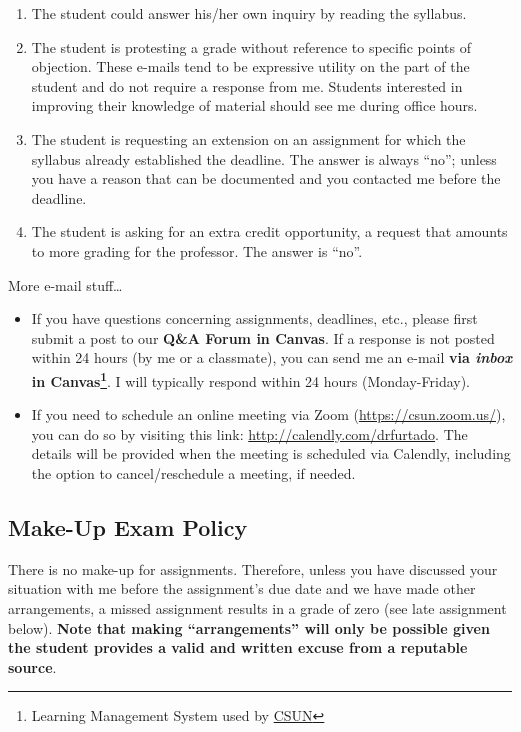 \documentclass[11pt,]{article}
\providecommand{\tightlist}{%
  \setlength{\itemsep}{0pt}\setlength{\parskip}{0pt}}
\begin{document}
\begin{enumerate}
\def\labelenumi{\arabic{enumi}.}
\tightlist
\item
  The student could answer his/her own inquiry by reading the syllabus.
\item
  The student is protesting a grade without reference to specific points
  of objection. These e-mails tend to be expressive utility on the part
  of the student and do not require a response from me. Students
  interested in improving their knowledge of material should see me
  during office hours.
\item
  The student is requesting an extension on an assignment for which the
  syllabus already established the deadline. The answer is always
  ``no''; unless you have a reason that can be documented and you
  contacted me before the deadline.
\item
  The student is asking for an extra credit opportunity, a request that
  amounts to more grading for the professor. The answer is ``no''.
\end{enumerate}

More e-mail stuff\ldots{}

\begin{itemize}
\item
  If you have questions concerning assignments, deadlines, etc., please
  first submit a post to our \textbf{Q\&A Forum in Canvas}. If a
  response is not posted within 24 hours (by me or a classmate), you can
  send me an e-mail \textbf{via \emph{inbox} in Canvas\footnote{Learning
    Management System used by
    \href{https://www.csun.edu/it/canvas}{CSUN}}}. I will typically
  respond within 24 hours (Monday-Friday).
\item
  If you need to schedule an online meeting via Zoom
  (\url{https://csun.zoom.us/}), you can do so by visiting this link:
  \url{http://calendly.com/drfurtado}. The details will be provided when
  the meeting is scheduled via Calendly, including the option to
  cancel/reschedule a meeting, if needed.
\end{itemize}

\hypertarget{make-up-exam-policy}{%
\subsection{Make-Up Exam Policy}\label{make-up-exam-policy}}

There is no make-up for assignments. Therefore, unless you have
discussed your situation with me before the assignment's due date and we
have made other arrangements, a missed assignment results in a grade of
zero (see late assignment below). \textbf{Note that making
``arrangements'' will only be possible given the student provides a
valid and written excuse from a reputable source}.
\end{document}
